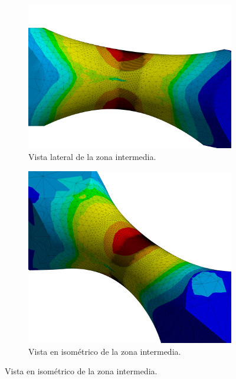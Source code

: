 \begin{figure}[p]
\centering
	\begin{subfigure}{0.8\linewidth}
		\centering
		\includegraphics[width=\linewidth]{Imagenes/r_lat.png}
		\caption{Vista lateral de la zona intermedia.}
		\label{fig:r_lat}
	\end{subfigure}
	\begin{subfigure}{0.8\linewidth}
		\centering
		\includegraphics[width=\linewidth]{Imagenes/r_iso.png}
		\caption{Vista en isométrico de la zona intermedia.}
		\label{fig:r_iso}
	\end{subfigure}
\end{figure}
